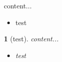 \documentclass{beamer}
\theoremstyle{example}
\newtheorem{example}{\translate{Example}}
\begin{document}
\begin{frame}

\begin{theorem}[test]
content...
\begin{itemize}
\item test
\end{itemize}
\end{theorem}

\begin{example}[test]
content...
\begin{itemize}
\item test
\end{itemize}
\end{example}


\end{frame} 
\end{document}
